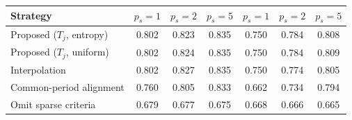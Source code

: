 \begin{tabular}{lcccccc}
\toprule
Strategy & $p_s{=}1$ & $p_s{=}2$ & $p_s{=}5$ & $p_s{=}1$ & $p_s{=}2$ & $p_s{=}5$ \\
\midrule
Proposed ($T_j$, entropy) & 0.802 & 0.823 & 0.835 & 0.750 & 0.784 & 0.808 \\
Proposed ($T_j$, uniform) & 0.802 & 0.824 & 0.835 & 0.750 & 0.784 & 0.809 \\
Interpolation & 0.802 & 0.827 & 0.835 & 0.750 & 0.774 & 0.805 \\
Common-period alignment & 0.760 & 0.805 & 0.833 & 0.662 & 0.734 & 0.794 \\
Omit sparse criteria & 0.679 & 0.677 & 0.675 & 0.668 & 0.666 & 0.665 \\
\bottomrule
\end{tabular}
